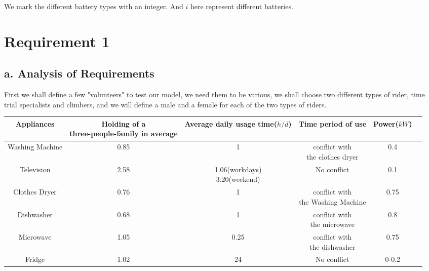 \documentclass[12pt]{article}
\begin{document}
We mark the different battery types with an integer. And $i$ here represent different batteries.

\section{Requirement 1}
\subsection{a. Analysis of Requirements}
First we shall define a few "volunteers" to test our model, we need them to be various, we shall choose two different types of rider, time trial
specialists and climbers, and we will define a male and a female for each of the two types of riders.
\normalsize
\begin{center}
    \begin{tabular}{|c | c |c | c |c  |c|}
        \hline
        \bf Appliances  & \makecell {\bf Holding of a                                                              \\ \bf three-people-family in average} & \makecell{\bf Average daily\\ \bf usage time($h/d$)}  & \bf Time period of use
                        & \bf Power($kW$)                                                                          \\ \hline
        Washing Machine & 0.85                        & 1                        & \makecell{conflict with         \\the clothes dryer} & 0.4 \\ \hline
        Television      & 2.58                        & \makecell{1.06(workdays)                                   \\3.20(weekend)} & No conflict & 0.1 \\ \hline
        Clothes Dryer   & 0.76                        & 1                        & \makecell{conflict with         \\the Washing Machine}& 0.75 \\ \hline
        Dishwasher      & 0.68                        & 1                        & \makecell{conflict with         \\ the microwave}& 0.8\\ \hline
        Microwave       & 1.05                        & 0.25                     & \makecell{conflict with         \\ the dishwasher } & 0.75 \\\hline
        Fridge          & 1.02                        & 24                       & No conflict             & 0-0.2 \\ \hline

\end{tabular}
\end{center}
\end{document}
